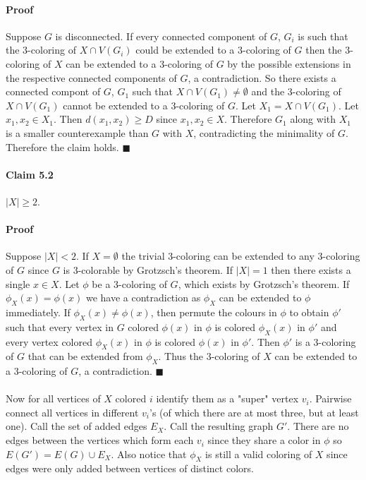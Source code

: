 \documentclass[letterpaper,12pt,oneside,onecolumn]{report}
\begin{document}
\paragraph{Proof}
Suppose $G$ is disconnected. If every connected component of $G$, $G_i$ is such that the $3$-coloring of $X \cap V(G_i)$ could be extended to a $3$-coloring of $G$ then the $3$-coloring of $X$ can be extended to a $3$-coloring of $G$ by the possible extensions in the respective connected components of $G$, a contradiction. So there exists a connected compont of $G$,  $G_1$ such that $X \cap V(G_1) \neq \emptyset$ and the $3$-coloring of $X \cap V(G_1)$ cannot be extended to a $3$-coloring of $G$. Let $X_1 = X \cap V(G_1)$. Let $x_1, x_2 \in X_1$. Then $d(x_1, x_2) \geq D$ since $x_1, x_2 \in X$. Therefore $G_1$ along with $X_1$ is a smaller counterexample than $G$ with $X$, contradicting the minimality of $G$. Therefore the claim holds. $\blacksquare$
\paragraph{Claim 5.2}
$|X| \geq 2$.
\paragraph{Proof}
Suppose $|X| < 2$. If $X = \emptyset$ the trivial $3$-coloring can be extended to any $3$-coloring of $G$ since $G$ is $3$-colorable by Grotzsch's theorem. If $|X| = 1$ then there exists a single $x \in X$.  Let $\phi$ be a $3$-coloring of $G$, which exists by Grotzsch's theorem. If $\phi_X(x) = \phi(x)$ we have a contradiction as $\phi_X$ can be extended to $\phi$ immediately. If $\phi_X(x) \neq \phi(x)$, then permute the colours in $\phi$ to obtain $\phi'$ such that every vertex in $G$ colored $\phi(x)$ in $\phi$ is colored $\phi_X(x)$ in $\phi'$ and every vertex colored $\phi_X(x)$ in $\phi$ is colored $\phi(x)$ in $\phi'$. Then $\phi'$ is a $3$-coloring of $G$ that can be extended from $\phi_X$. Thus the $3$-coloring of $X$ can be extended to a $3$-coloring of $G$, a contradiction. $\blacksquare$
\paragraph{}
Now for all vertices of $X$ colored $i$ identify them as a "super" vertex $v_i$. Pairwise connect all vertices in different $v_i$'s (of which there are at most three, but at least one). Call the set of added edges $E_X$. Call the resulting graph $G'$. There are no edges between the vertices which form each $v_i$  since they share a color in $\phi$ so $E(G') = E(G) \cup E_X $. Also notice that $\phi_X$ is still a valid coloring of $X$ since edges were only added between vertices of distinct colors.
\end{document}
